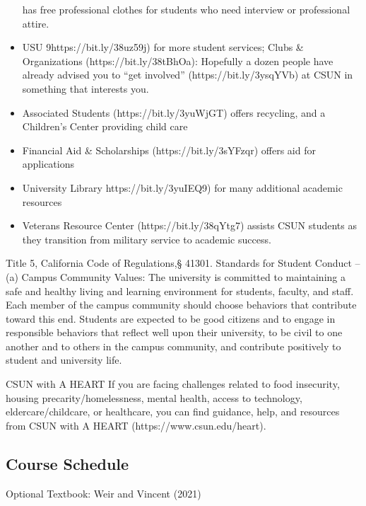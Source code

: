 \documentclass[
  letterpaper,
  DIV=11,
  numbers=noendperiod]{scrartcl}
\begin{document}
\begin{itemize}
  has free professional clothes for students who need interview or
  professional attire.
\item
  USU 9https://bit.ly/38uz59j) for more student services; Clubs \&
  Organizations (https://bit.ly/38tBhOa): Hopefully a dozen people have
  already advised you to ``get involved'' (https://bit.ly/3ysqYVb) at
  CSUN in something that interests you.
\item
  Associated Students (https://bit.ly/3yuWjGT) offers recycling, and a
  Children's Center providing child care
\item
  Financial Aid \& Scholarships (https://bit.ly/3sYFzqr) offers aid for
  applications
\item
  University Library https://bit.ly/3yuIEQ9) for many additional
  academic resources
\item
  Veterans Resource Center (https://bit.ly/38qYtg7) assists CSUN
  students as they transition from military service to academic success.
\end{itemize}

Title 5, California Code of Regulations,§ 41301. Standards for Student
Conduct -- (a) Campus Community Values: The university is committed to
maintaining a safe and healthy living and learning environment for
students, faculty, and staff. Each member of the campus community should
choose behaviors that contribute toward this end. Students are expected
to be good citizens and to engage in responsible behaviors that reflect
well upon their university, to be civil to one another and to others in
the campus community, and contribute positively to student and
university life.

CSUN with A HEART If you are facing challenges related to food
insecurity, housing precarity/homelessness, mental health, access to
technology, eldercare/childcare, or healthcare, you can find guidance,
help, and resources from CSUN with A HEART (https://www.csun.edu/heart).

\hypertarget{course-schedule}{%
\subsection{Course Schedule}\label{course-schedule}}

Optional Textbook: Weir and Vincent (2021)
\end{document}
